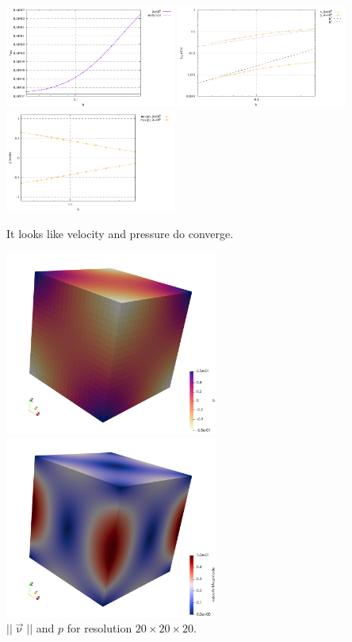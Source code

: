 \begin{center}
\includegraphics[width=5.6cm]{python_codes/fieldstone_10/resultsQ2/exp5/vrms}
\includegraphics[width=5.6cm]{python_codes/fieldstone_10/resultsQ2/exp5/conv}
\includegraphics[width=5.6cm]{python_codes/fieldstone_10/resultsQ2/exp5/p_stats}
\end{center}

It looks like velocity and pressure do converge.  

\begin{center}
\includegraphics[width=7cm]{python_codes/fieldstone_10/resultsQ2/exp5/press}
\includegraphics[width=7cm]{python_codes/fieldstone_10/resultsQ2/exp5/vel}\\
{\captionfont $||\vec\upnu||$ and $p$ for resolution $20\times 20 \times 20$.}
\end{center}



